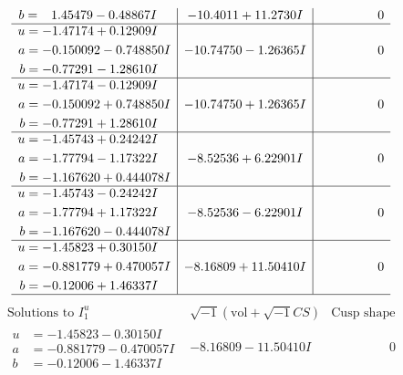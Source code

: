 \documentclass[1p]{elsarticle_modified}
\theoremstyle{definition}
\newcommand{\I}{\sqrt{-1}}
\begin{document}
$$\begin{array}{c|c|c}
\begin{aligned}
b &= \phantom{-}1.45479 - 0.48867 I\end{aligned}
 & -10.4011 + 11.2730 I & \phantom{-0.000000 } 0 \\ \hline\begin{aligned}
u &= -1.47174 + 0.12909 I \\
a &= -0.150092 - 0.748850 I \\
b &= -0.77291 - 1.28610 I\end{aligned}
 & -10.74750 - 1.26365 I & \phantom{-0.000000 } 0 \\ \hline\begin{aligned}
u &= -1.47174 - 0.12909 I \\
a &= -0.150092 + 0.748850 I \\
b &= -0.77291 + 1.28610 I\end{aligned}
 & -10.74750 + 1.26365 I & \phantom{-0.000000 } 0 \\ \hline\begin{aligned}
u &= -1.45743 + 0.24242 I \\
a &= -1.77794 - 1.17322 I \\
b &= -1.167620 + 0.444078 I\end{aligned}
 & -8.52536 + 6.22901 I & \phantom{-0.000000 } 0 \\ \hline\begin{aligned}
u &= -1.45743 - 0.24242 I \\
a &= -1.77794 + 1.17322 I \\
b &= -1.167620 - 0.444078 I\end{aligned}
 & -8.52536 - 6.22901 I & \phantom{-0.000000 } 0 \\ \hline\begin{aligned}
u &= -1.45823 + 0.30150 I \\
a &= -0.881779 + 0.470057 I \\
b &= -0.12006 + 1.46337 I\end{aligned}
 & -8.16809 + 11.50410 I & \phantom{-0.000000 } 0\\
 \hline 
 \end{array}$$\newpage$$\begin{array}{c|c|c}  
\text{Solutions to }I^u_{1}& \I (\text{vol} + \sqrt{-1}CS) & \text{Cusp shape}\\
 \hline 
\begin{aligned}
u &= -1.45823 - 0.30150 I \\
a &= -0.881779 - 0.470057 I \\
b &= -0.12006 - 1.46337 I\end{aligned}
 & -8.16809 - 11.50410 I & \phantom{-0.000000 } 0 \\ \hline\begin{aligned}

\end{aligned}
\end{array}$$
\end{document}
